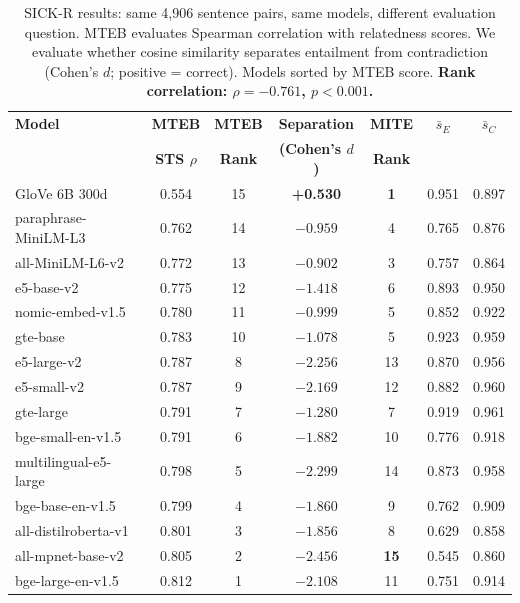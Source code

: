 \documentclass{article}
\begin{document}
\begin{table}[t]
\centering
\caption{SICK-R results: same 4,906 sentence pairs, same models, different evaluation question. MTEB evaluates Spearman correlation with relatedness scores. We evaluate whether cosine similarity separates entailment from contradiction (Cohen's $d$; positive = correct). Models sorted by MTEB score. \textbf{Rank correlation: $\rho = -0.761$, $p < 0.001$.}}
\label{tab:sickr_results}
\small
\begin{tabular}{@{}lcccccc@{}}
\toprule
\textbf{Model} & \textbf{MTEB} & \textbf{MTEB} & \textbf{Separation} & \textbf{MITE} & $\bar{s}_E$ & $\bar{s}_C$ \\
 & \textbf{STS $\rho$} & \textbf{Rank} & \textbf{(Cohen's $d$)} & \textbf{Rank} & & \\
\midrule
GloVe 6B 300d       & 0.554 & 15 & \textbf{+0.530} & \textbf{1} & 0.951 & 0.897 \\
paraphrase-MiniLM-L3 & 0.762 & 14 & $-0.959$ & 4 & 0.765 & 0.876 \\
all-MiniLM-L6-v2     & 0.772 & 13 & $-0.902$ & 3 & 0.757 & 0.864 \\
e5-base-v2           & 0.775 & 12 & $-1.418$ & 6 & 0.893 & 0.950 \\
nomic-embed-v1.5     & 0.780 & 11 & $-0.999$ & 5 & 0.852 & 0.922 \\
gte-base             & 0.783 & 10 & $-1.078$ & 5 & 0.923 & 0.959 \\
e5-large-v2          & 0.787 & 8 & $-2.256$ & 13 & 0.870 & 0.956 \\
e5-small-v2          & 0.787 & 9 & $-2.169$ & 12 & 0.882 & 0.960 \\
gte-large            & 0.791 & 7 & $-1.280$ & 7 & 0.919 & 0.961 \\
bge-small-en-v1.5    & 0.791 & 6 & $-1.882$ & 10 & 0.776 & 0.918 \\
multilingual-e5-large & 0.798 & 5 & $-2.299$ & 14 & 0.873 & 0.958 \\
bge-base-en-v1.5     & 0.799 & 4 & $-1.860$ & 9 & 0.762 & 0.909 \\
all-distilroberta-v1 & 0.801 & 3 & $-1.856$ & 8 & 0.629 & 0.858 \\
all-mpnet-base-v2    & 0.805 & 2 & $-2.456$ & \textbf{15} & 0.545 & 0.860 \\
bge-large-en-v1.5    & 0.812 & 1 & $-2.108$ & 11 & 0.751 & 0.914 \\
\bottomrule
\end{tabular}
\end{table}
\end{document}
